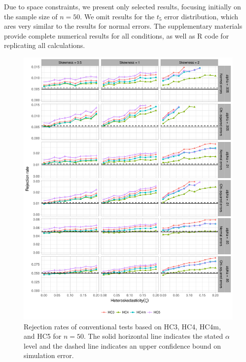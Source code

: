 \documentclass[12pt]{article}\usepackage[]{graphicx}\usepackage[]{color}
\newenvironment{knitrout}{}{} %
\begin{document}
Due to space constraints, we present only selected results, focusing initially on the sample size of $n = 50$. We omit results for the $t_5$ error distribution, which ares very similar to the results for normal errors. The supplementary materials provide complete numerical results for all conditions, as well as R code for replicating all calculations.

\begin{knitrout}
\color{fgcolor}\begin{figure}[p]

{\centering \includegraphics[width=\linewidth]{HC_fig/HC_size-1} 

}

\caption[Rejection rates of conventional tests based on HC3, HC4, HC4m, and HC5 for $n = 50$]{Rejection rates of conventional tests based on HC3, HC4, HC4m, and HC5 for $n = 50$. The solid horizontal line indicates the stated $\alpha$ level and the dashed line indicates an upper confidence bound on simulation error.}\label{fig:HC_size}
\end{figure}


\end{knitrout}
\end{document}
